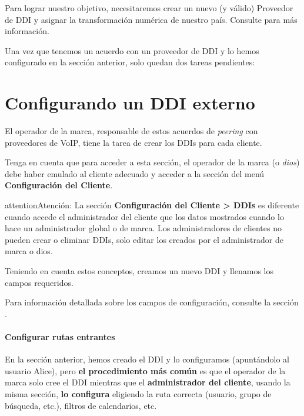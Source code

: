 \documentclass[letterpaper,10pt,spanish]{sphinxmanual}
\begin{document}
Para lograr nuestro objetivo, necesitaremos crear un nuevo (y válido) Proveedor de DDI y asignar la transformación numérica de nuestro país. Consulte {\hyperref[administration_portal/brand/providers/ddi_providers:ddi\string-providers]{}} para más información.

Una vez que tenemos un acuerdo con un proveedor de DDI y lo hemos configurado en la sección anterior, solo quedan dos tareas pendientes:


\section{Configurando un DDI externo}
\label{getting_started/external_incoming_calls/configure_ddi:settingup-ddi}\label{getting_started/external_incoming_calls/configure_ddi:configuring-an-external-ddi}\label{getting_started/external_incoming_calls/configure_ddi::doc}
El operador de la marca, responsable de estos acuerdos de \emph{peering} con proveedores de VoIP, tiene la tarea de crear los DDIs para cada cliente.

Tenga en cuenta que para acceder a esta sección, el operador de la marca (o \emph{dios}) debe haber emulado al cliente adecuado y acceder a la sección del menú \textbf{Configuración del Cliente}.

\begin{notice}{attention}{Atención:}
La sección \textbf{Configuración del Cliente \textgreater{} DDIs} es diferente cuando accede el administrador del cliente que los datos mostrados cuando lo hace un administrador global o de marca. Los administradores de clientes no pueden crear o eliminar DDIs, solo editar los creados por el administrador de marca o dios.
\end{notice}

Teniendo en cuenta estos conceptos, creamos un nuevo DDI y llenamos los campos requeridos.

Para información detallada sobre los campos de configuración, consulte la sección {\hyperref[administration_portal/client/vpbx/ddis:pbx\string-ddis]{}}.
\paragraph{Configurar rutas entrantes}

En la sección anterior, hemos creado el DDI y lo configuramos (apuntándolo al usuario Alice), pero \textbf{el procedimiento más común} es que el operador de la marca solo cree el DDI mientras que el \textbf{administrador del cliente}, usando la misma sección, \textbf{lo configura} eligiendo la ruta correcta (usuario, grupo de búsqueda, etc.), filtros de calendarios, etc.
\end{document}
